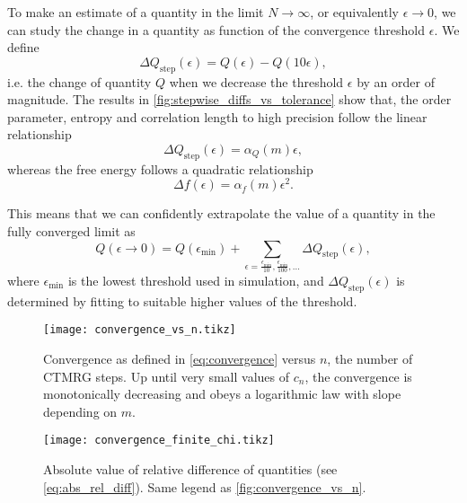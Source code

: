 To make an estimate of a quantity in the limit $N \to \infty$, or equivalently $\epsilon \to 0$,
we can study the change in a quantity as function of the convergence threshold $\epsilon$. We define
\begin{equation}\label{eq:stepwise_difference_epsilon}
  \Delta Q_{\text{step}}(\epsilon) = Q(\epsilon) - Q(10\epsilon),
\end{equation}
i.e. the change of quantity $Q$ when we decrease the threshold $\epsilon$ by an order of magnitude. The results in
\autoref{fig:stepwise_diffs_vs_tolerance} show that, the order parameter, entropy and correlation length
to high precision follow the linear relationship
\begin{equation}\label{eq:stepwise_difference_linear}
  \Delta Q_{\text{step}}(\epsilon) = \alpha_{Q}(m) \epsilon,
\end{equation}
whereas the free energy follows a quadratic relationship
\begin{equation}\label{eq:stepwise_difference_quadratic}
  \Delta f(\epsilon) = \alpha_{f}(m) \epsilon^2.
\end{equation}

This means that we can confidently extrapolate the value of a quantity in the fully converged limit as
\begin{equation}\label{eq:extrapolation_fully_converged_limit_finite_m}
  Q(\epsilon \to 0) = Q(\epsilon_{\text{min}}) + \sum_{\epsilon = \frac{\epsilon_{\text{min}}}{10},
  \frac{\epsilon_{\text{min}}}{100}, \dots} \Delta Q_{\text{step}}(\epsilon),
\end{equation}
where $\epsilon_{\text{min}}$ is the lowest threshold used in simulation, and $\Delta Q_{\text{step}}(\epsilon)$ is determined
by fitting to suitable higher values of the threshold.

\begin{figure}
  \texttt{[image: convergence\_vs\_n.tikz]}
  \caption{Convergence as defined in \autoref{eq:convergence} versus $n$, the number of CTMRG
  steps.
  Up until very small values of $c_n$, the convergence is monotonically decreasing and obeys
  a logarithmic law with slope depending on $m$.}\label{fig:convergence_vs_n}
\end{figure}

\begin{figure}
  \texttt{[image: convergence\_finite\_chi.tikz]}
  \caption{Absolute value of relative difference of quantities (see \autoref{eq:abs_rel_diff}).
  Same legend as \autoref{fig:convergence_vs_n}.}\label{fig:convergence_finite_chi}
\end{figure}

